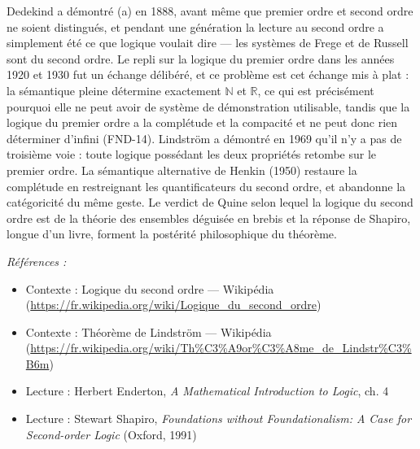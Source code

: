 \documentclass[11pt]{article}
\newenvironment{refs}{\par\small\noindent\emph{Références :}\begin{itemize}\setlength\itemsep{0pt}}{\end{itemize}\normalsize}
\begin{document}
\noindent Dedekind a démontré (a) en 1888, avant même que \og{} premier ordre \fg{} et \og{} second
ordre \fg{} ne soient distingués, et pendant une génération la lecture au second ordre a simplement
été ce que \og{} logique \fg{} voulait dire --- les systèmes de Frege et de Russell sont du second ordre. Le
repli sur la logique du premier ordre dans les années 1920 et 1930 fut un échange délibéré, et ce
problème est cet échange mis à plat : la sémantique pleine détermine exactement $ \mathbb{N} $
et $ \mathbb{R} $, ce qui est précisément pourquoi elle ne peut avoir de système de
démonstration utilisable, tandis que la logique du premier ordre a la complétude et la compacité
et ne peut donc rien déterminer d'infini (FND-14). Lindström a démontré en 1969 qu'il n'y a pas de
troisième voie : toute logique possédant les deux propriétés retombe sur le premier ordre. La
sémantique alternative de Henkin (1950) restaure la complétude en restreignant les quantificateurs
du second ordre, et abandonne la catégoricité du même geste. Le verdict de Quine selon lequel la
logique du second ordre est \og{} de la théorie des ensembles déguisée en brebis \fg{} et la réponse de
Shapiro, longue d'un livre, forment la postérité philosophique du théorème.

\begin{refs}
\item Contexte : Logique du second ordre --- Wikipédia (\url{https://fr.wikipedia.org/wiki/Logique_du_second_ordre})
\item Contexte : Théorème de Lindström --- Wikipédia (\url{https://fr.wikipedia.org/wiki/Th%C3%A9or%C3%A8me_de_Lindstr%C3%B6m})
\item Lecture : Herbert Enderton, \textit{A Mathematical Introduction to Logic}, ch. 4
\item Lecture : Stewart Shapiro, \textit{Foundations without Foundationalism: A Case for Second-order Logic} (Oxford, 1991)
\end{refs}

\bigskip
\end{document}
